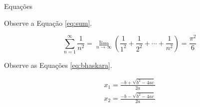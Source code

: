 \documentclass{beamer}
\begin{document}
\begin{frame}{Equações}

Observe a Equação \ref{eq:sum}.

\begin{equation}\label{eq:sum}
\sum_{n=1}^\infty \frac{1}{n^2} = \lim_{n \to \infty} \left( \frac{1}{1^2} + \frac{1}{2^2} + \cdots + \frac{1}{n^2} \right) = \frac{\pi^2}{6}
\end{equation}

Observe as Equações \ref{eq:bhaskara}.

\begin{equation}\label{eq:bhaskara}
\begin{split}
x_1 = \frac{-b + \sqrt{b^2 - 4ac}}{2a} \\
x_2 = \frac{-b - \sqrt{b^2 - 4ac}}{2a}
\end{split}
\end{equation}

\end{frame}


\end{document}
